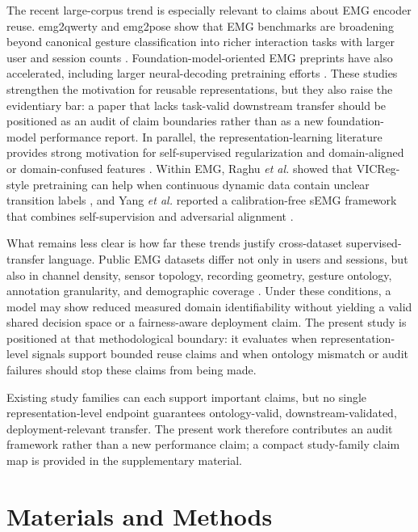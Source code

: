 \documentclass[journal]{IEEEtran}
\begin{document}
The recent large-corpus trend is especially relevant to claims about EMG encoder reuse. emg2qwerty and emg2pose show that EMG benchmarks are broadening beyond canonical gesture classification into richer interaction tasks with larger user and session counts \cite{sivakumar2024emg2qwerty,salter2024emg2pose}. Foundation-model-oriented EMG preprints have also accelerated, including larger neural-decoding pretraining efforts \cite{kurbis2025emgnet}. These studies strengthen the motivation for reusable representations, but they also raise the evidentiary bar: a paper that lacks task-valid downstream transfer should be positioned as an audit of claim boundaries rather than as a new foundation-model performance report. In parallel, the representation-learning literature provides strong motivation for self-supervised regularization and domain-aligned or domain-confused features \cite{bardes2022vicreg,ganin2016dann,sun2016deepcoral}. Within EMG, Raghu \emph{et al.} showed that VICReg-style pretraining can help when continuous dynamic data contain unclear transition labels \cite{raghu2025vicregemg}, and Yang \emph{et al.} reported a calibration-free sEMG framework that combines self-supervision and adversarial alignment \cite{yang2025calibrationfree}.

What remains less clear is how far these trends justify cross-dataset supervised-transfer language. Public EMG datasets differ not only in users and sessions, but also in channel density, sensor topology, recording geometry, gesture ontology, annotation granularity, and demographic coverage \cite{pradhan2022grabmyo,jiang2021hyser,yang2024emgbench,gowda2025demographicsemg}. Under these conditions, a model may show reduced measured domain identifiability without yielding a valid shared decision space or a fairness-aware deployment claim. The present study is positioned at that methodological boundary: it evaluates when representation-level signals support bounded reuse claims and when ontology mismatch or audit failures should stop these claims from being made.

Existing study families can each support important claims, but no single representation-level endpoint guarantees ontology-valid, downstream-validated, deployment-relevant transfer. The present work therefore contributes an audit framework rather than a new performance claim; a compact study-family claim map is provided in the supplementary material.

\section{Materials and Methods}
\end{document}
